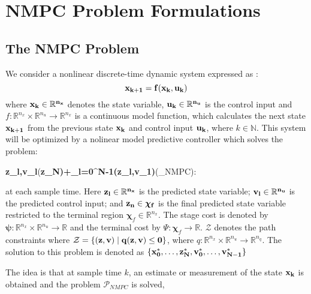\section{NMPC Problem Formulations}
\subsection{The NMPC Problem}
We consider a nonlinear discrete-time dynamic system expressed as \cite{economic}:
\begin{equation}
	\bf{x}_{k+1}=f(\bf{x}_k,\bf{u}_k)
	\label{eq:nonlin}
\end{equation}
where $\bf{x}_k\in\mathbb{R}^{n_x}$ denotes the state variable, $\bf{u}_k\in\mathbb{R}^{n_u}$ is the control input and $f:\mathbb{R}^{n_x}\times\mathbb{R}^{n_u}\rightarrow \mathbb{R}^{n_x}$ is a continuous model function, which calculates the next state $\bf{x}_{k+1}$ from the previous state $\bf{x}_k$ and control input $\bf{u}_k$, where $k\in\mathbb{N}$.
This system will be optimized by a nolinear model predictive controller which solves the problem:
	\begin{mini!}
		{\bf{z}_l,\bf{v}_l}{\boldsymbol{\Psi}(\bf{z}_N)+\sum_{l=0}^{N-1}\boldsymbol{\psi}(\bf{z}_l,\bf{v}_1)}{}{(_{NMPC}):}
	\end{mini!}
at each sample time.
Here $\bf{z}_l\in\mathbb{R}^{n_x}$ is the predicted state variable; $\bf{v}_l\in\mathbb{R}^{n_u}$ is the predicted control input; and $\bf{z}_n\in\boldsymbol{\chi}_f$ is the final predicted state variable restricted to the terminal region $\boldsymbol{\chi}_f\in\mathbb{R}^{n_x}$.
The stage cost is denoted by $\boldsymbol{\psi}:\mathbb{R}^{n_x}\times\mathbb{R}^{n_u}\rightarrow\mathbb{R}$ and the terminal cost by $\Psi:\boldsymbol{\chi}_f\rightarrow\mathbb{R}$.
$\mathcal{Z}$ denotes the path constraints where $\mathcal{Z}=\{(\bf{z},\bf{v})\;|\;q(\bf{z},\bf{v})\leq 0\}$, where $q:\mathbb{R}^{n_x}\times\mathbb{R}^{n_u}\rightarrow\mathbb{R}^{n_q}$.
The solution to this problem is denoted as $\{\bf{x}_0^*,\ldots,\bf{z}_N^*,\bf{v}_0^*,\ldots,\bf{v}_{N-1}^*\}$
\par
The idea is that at sample time $k$, an estimate or measurement of the state $\bf{x}_k$ is obtained and the problem $\mathcal{P}_{NMPC}$ is solved,
